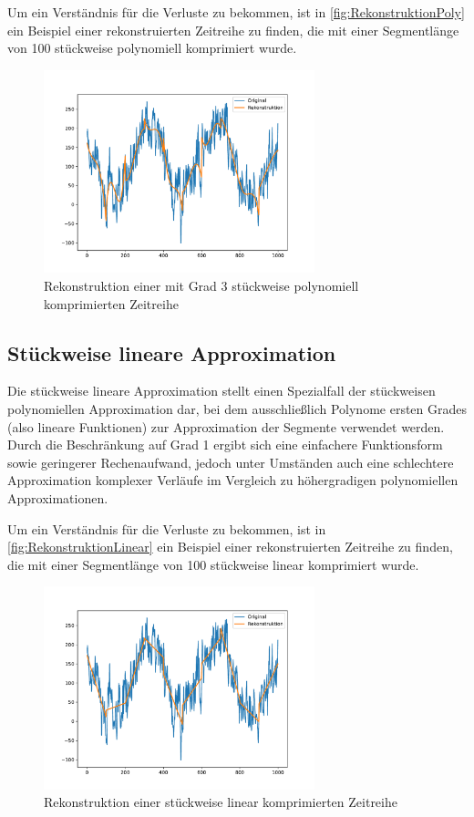 Um ein Verständnis für die Verluste zu bekommen, ist in \autoref{fig:RekonstruktionPoly} ein Beispiel einer rekonstruierten Zeitreihe zu finden, die mit einer Segmentlänge von 100 stückweise polynomiell komprimiert wurde.
\begin{figure}[bth] 
  \centering
  \includegraphics[width=0.7\textwidth]{Graphics/RekonstruktionPoly.pdf}
  \caption{Rekonstruktion einer mit Grad 3 stückweise polynomiell komprimierten Zeitreihe}
  \label{fig:RekonstruktionPoly}
\end{figure}

\subsection{Stückweise lineare Approximation}
Die stückweise lineare Approximation stellt einen Spezialfall der stückweisen polynomiellen Approximation dar, bei dem ausschließlich Polynome ersten Grades (also lineare Funktionen) zur Approximation der Segmente verwendet werden.
Durch die Beschränkung auf Grad 1 ergibt sich eine einfachere Funktionsform sowie geringerer Rechenaufwand, jedoch unter Umständen auch eine schlechtere Approximation komplexer Verläufe im Vergleich zu höhergradigen polynomiellen Approximationen.

Um ein Verständnis für die Verluste zu bekommen, ist in \autoref{fig:RekonstruktionLinear} ein Beispiel einer rekonstruierten Zeitreihe zu finden, die mit einer Segmentlänge von 100 stückweise linear komprimiert wurde.
\begin{figure}[bth] 
  \centering
  \includegraphics[width=0.7\textwidth]{Graphics/RekonstruktionLinear.pdf}
  \caption{Rekonstruktion einer stückweise linear komprimierten Zeitreihe}
  \label{fig:RekonstruktionLinear}
\end{figure}

